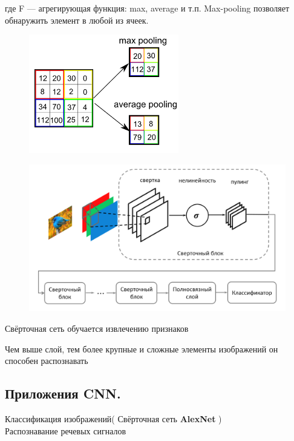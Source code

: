 \begin{description}
где  F  — агрегирующая функция: max, average и т.п. Max-pooling позволяет обнаружить элемент в любой из ячеек.

\begin{figure}[h]

\centering

\includegraphics[width=0.2\linewidth]{chapters/neural/images/пуллинг.png}

\label{fig:mpr}

\end{figure}

\begin{figure}[h]

\centering

\includegraphics[width=0.8\linewidth]{chapters/neural/images/1CNN.png}

\label{fig:mpr}

\end{figure}

Свёрточная сеть обучается извлечению признаков

Чем выше слой, тем более крупные и сложные элементы изображений он способен распознавать

\newpage
\subsection{Приложения CNN.}

Классификация изображений( Свёрточная сеть \textbf{AlexNet} )\\

Распознавание речевых сигналов\\
\begin{figure}[h]


\end{figure}
\end{description}
